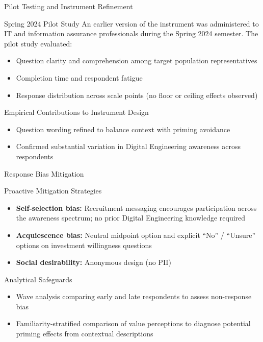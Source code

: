 \documentclass{beamer}
\begin{document}
\begin{frame}[allowframebreaks]{Pilot Testing and Instrument Refinement}
  \begin{block}{Spring 2024 Pilot Study}
    \small{An earlier version of the instrument was administered to IT and information assurance professionals during the Spring 2024 semester. The pilot study evaluated:}
    \begin{itemize}
      \item Question clarity and comprehension among target population representatives
      \item Completion time and respondent fatigue
      \item Response distribution across scale points (no floor or ceiling effects observed)
    \end{itemize}
  \end{block}

  \begin{block}{Empirical Contributions to Instrument Design}
    \begin{itemize}
      \item Question wording refined to balance context with priming avoidance
      \item Confirmed substantial variation in Digital Engineering awareness across respondents
    \end{itemize}
  \end{block}
\end{frame}

\begin{frame}[allowframebreaks]{Response Bias Mitigation}
  \begin{block}{Proactive Mitigation Strategies}
    \begin{itemize}
      \item \textbf{Self-selection bias:} Recruitment messaging encourages participation across the awareness spectrum; no prior Digital Engineering knowledge required
      \item \textbf{Acquiescence bias:} Neutral midpoint option and explicit ``No'' / ``Unsure'' options on investment willingness questions
      \item \textbf{Social desirability:} Anonymous design (no PII)
    \end{itemize}
  \end{block}

  \begin{block}{Analytical Safeguards}
    \begin{itemize}
      \item Wave analysis comparing early and late respondents to assess non-response bias
      \item Familiarity-stratified comparison of value perceptions to diagnose potential priming effects from contextual descriptions
    \end{itemize}
  \end{block}
\end{frame}
\end{document}
